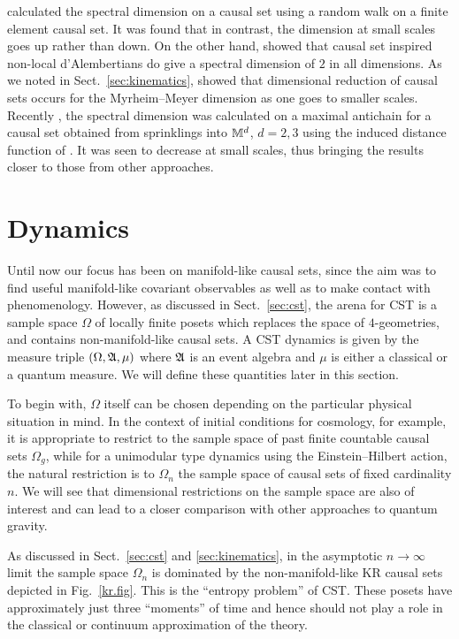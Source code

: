 \cite{em} calculated the spectral dimension on a causal set using  a random walk on a finite element causal
set. It was found that in contrast, the dimension at small scales goes up rather than down.
On the other hand, \cite{diondr} showed  that  causal set inspired  non-local d'Alembertians do give a spectral
dimension of $2$ in all dimensions. As we noted in  Sect.~\ref{sec:kinematics},  \cite{carlipdrone}  showed that  dimensional reduction
of causal sets occurs for the Myrheim--Meyer dimension as one goes to smaller scales.  Recently \citep{esvsd}, the spectral dimension
was calculated on a maximal antichain for a causal set obtained from sprinklings into $\mathbb M^d$, $d=2,3$ using the
induced distance function of \cite{esv}. It was seen to decrease at small scales, thus bringing the results closer to
those from other approaches.   



\section{Dynamics} 
\label{sec:dynamics}        

Until now our focus has been on manifold-like causal sets, since the aim was to find useful manifold-like covariant
observables as well as to make contact with phenomenology.  However, as discussed in Sect.~\ref{sec:cst}, the arena for CST is a sample space
$\Omega$ of locally finite posets which replaces the space of $4$-geometries, and contains non-manifold-like causal
sets.  A CST  dynamics is given by the measure 
triple $(\Omega, \mathfrak A, \mu)$ where $\mathfrak A$ is an event algebra and $\mu$ is either a classical or a quantum  measure. 
 We will define these quantities  later  in this section.

To begin with, $\Omega$ itself can be chosen depending on the particular physical situation in mind.  In the
context of initial conditions for cosmology, for example,  it is appropriate to  restrict to the sample space of past finite
countable causal sets $\Omega_{g}$, while for a  unimodular type dynamics using the Einstein--Hilbert action,   the
natural restriction is to $\Omega_n$  the sample space  of causal sets of fixed cardinality $n$.  We will see that
dimensional  restrictions on the  sample space are also of interest  and
can lead to a closer comparison with other approaches to quantum gravity.

As discussed in Sect.~\ref{sec:cst} and \ref{sec:kinematics},  in the asymptotic $n \rightarrow \infty$ limit  the sample space $\Omega_n$ is
dominated  by the non-manifold-like  KR  causal sets depicted in Fig.~\ref{kr.fig}. This is the ``entropy problem'' of
CST. 
These posets have approximately just three ``moments'' of time and hence should not  play a role in the classical or
continuum approximation of the theory. 


